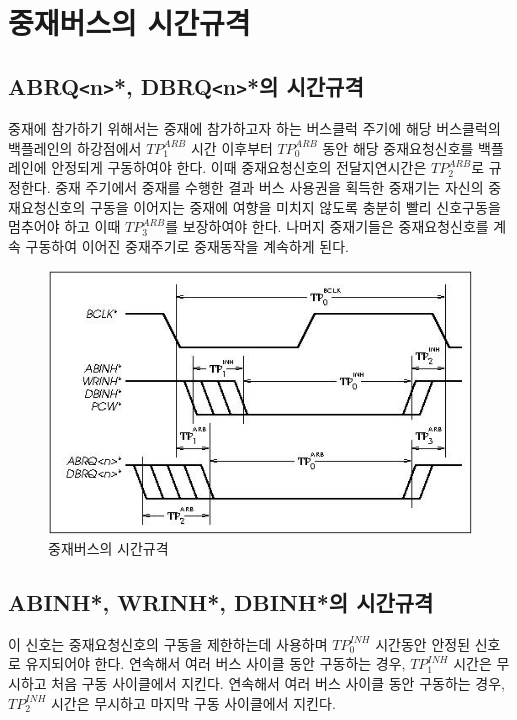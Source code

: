 \section{중재버스의 시간규격}
\subsection{ABRQ{\tt <}n{\tt >}*, DBRQ{\tt <}n{\tt >}*의 시간규격}
중재에 참가하기 위해서는 중재에 참가하고자 하는 버스클럭 주기에
해당 버스클럭의 백플레인의 하강점에서 $TP^{ARB}_1$ 시간 이후부터
$TP^{ARB}_0$ 동안 해당 중재요청신호를 백플레인에 안정되게 구동하여야 한다.
이때 중재요청신호의 전달지연시간은 $TP^{ARB}_2$로 규정한다.
중재 주기에서 중재를 수행한 결과 버스 사용권을 획득한 중재기는 자신의 중재요청신호의
구동을 이어지는 중재에 여향을 미치지 않도록 충분히 빨리 신호구동을 멈추어야 하고
이때 $TP^{ARB}_3$를 보장하여야 한다.
나머지 중재기들은 중재요청신호를 계속 구동하여 이어진 중재주기로 중재동작을 계속하게 된다.

\begin{figure}[htb]
    \centerline{\includegraphics{ch6/FIG/arb-time.jpg}}
   \caption{중재버스의 시간규격}\label{figure:arb-time}
\end{figure}
%
\subsection{ABINH*, WRINH*, DBINH*의 시간규격}
이 신호는 중재요청신호의 구동을 제한하는데 사용하며
$TP^{INH}_0$ 시간동안 안정된 신호로 유지되어야 한다.
연속해서 여러 버스 사이클 동안 구동하는 경우, $TP^{INH}_1$ 시간은 무시하고
처음 구동 사이클에서 지킨다.
연속해서 여러 버스 사이클 동안 구동하는 경우, $TP^{INH}_2$ 시간은 무시하고
마지막 구동 사이클에서 지킨다.
%
